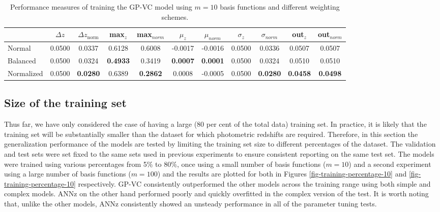 \documentclass[useAMS,usenatbib,fleqn]{mn2e}
\begin{document}
 \begin{table}
\caption{Performance measures of training the GP-VC model using $m=10$ basis functions and different weighting schemes.}
\begin{center}
\begin{tabular}{| l | c | c |  c | c |  c | c |  c | c |  c | c | }
     				&	$\Delta z$	&	$\Delta z_\textrm{norm}$	&	max$_{z}$ & max$_{norm}$		&	$\mu_{z}$&	$\mu_{norm}$	& $\sigma_{z}$ & $\sigma_{norm}$ & out$_{z}$&out$_{norm}$\\	\hline
	Normal		&	0.0500	&	0.0337		&	0.6128		&	0.6008&	-0.0017		&	-0.0016&	0.0500		&	0.0336&	0.0507		&	0.0507\\
	Balanced		&	0.0500 	&	0.0324		&	\textbf{0.4933}	&	0.3419&	\textbf{0.0007}		&	\textbf{0.0001}&	0.0500		&	0.0324&	0.0510 	&	0.0510	\\
	Normalized	&	0.0500 	&	\textbf{0.0280}	&	0.6389		&	\textbf{0.2862}&	0.0008			&	-0.0005&	0.0500		&	\textbf{0.0280}&	\textbf{0.0458}	&	\textbf{0.0498	}\\\hline
  \end{tabular}
\end{center}
\label{table-normal-balanced}
\end{table}

\subsection{Size of the training set}
\label{sec-sizetraining}

Thus far, we have only considered the case of having a large (80 per cent of the total data) training set. In practice, it is likely that the training set will be substantially smaller than the dataset for which photometric redshifts are required. Therefore, in this section the generalization performance of the models are tested by limiting the training set size to different percentages of the dataset. The validation and test sets were set fixed to the same sets used in previous experiments to ensure consistent reporting on the same test set. The models were trained using various percentages from 5\% to 80\%, once using a small number of basis functions ($m=10$) and a second experiment using a large number of basis functions ($m=100$) and the results are plotted for both in Figures \ref{fig-training-percentage-10} and \ref{fig-training-percentage-10} respectively. GP-VC consistently outperformed the other models across the training range using both simple and complex models. {ANNz} on the other hand performed poorly and quickly overfitted in the complex version of the test. It is worth noting that, unlike the other models, {ANNz} consistently showed an unsteady performance in all of the parameter tuning tests.
\end{document}
